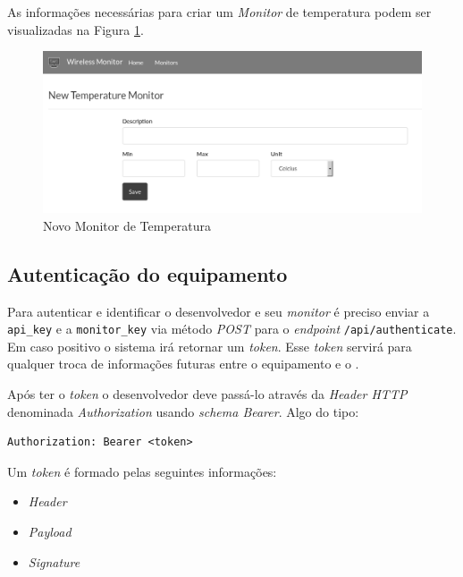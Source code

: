 As informações necessárias para criar um \emph{Monitor} de temperatura
podem ser visualizadas na Figura \ref{fig:new-temperature-monitor}.

\begin{figure}[h]
    \centering
    \includegraphics[scale=0.35]{img/new-temperature-monitor-grey.png}
    \caption{Novo Monitor de Temperatura} \label{fig:new-temperature-monitor}
\end{figure}

\subsection{Autenticação do
equipamento}\label{autenticauxe7uxe3o-do-equipamento}

Para autenticar e identificar o desenvolvedor e seu \emph{monitor} é
preciso enviar a \texttt{api\_key} e a \texttt{monitor\_key} via método
\emph{POST} para o \emph{endpoint} \texttt{/api/authenticate}. Em caso
positivo o sistema irá retornar um \emph{token}. Esse \emph{token}
servirá para qualquer troca de informações futuras entre o equipamento
\iot e o \wm.

Após ter o \emph{token} o desenvolvedor deve passá-lo através da
\emph{Header HTTP} denominada \emph{Authorization} usando \emph{schema
Bearer}. Algo do tipo:

\begin{verbatim}
Authorization: Bearer <token>
\end{verbatim}

Um \emph{token} é formado pelas seguintes informações:

\begin{itemize}
\itemsep1pt\parskip0pt
\item
  \emph{Header}
\item
  \emph{Payload}
\item
  \emph{Signature}
\end{itemize}

